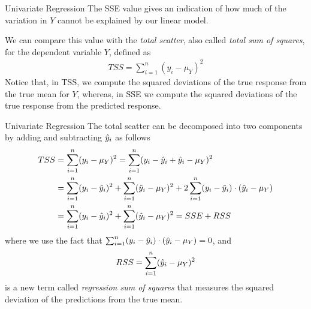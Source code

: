 %
\begin{frame}{Univariate Regression}
The SSE value gives an indication of how much of the variation in $Y$
cannot be explained by our linear model. 

	\medskip

	We can compare this value with
the {\em total scatter}, also called {\em total sum of squares}, 
for the dependent variable $Y$, defined as
\begin{align*}
    TSS = \sum^{n}_{i=1} (y_i - \mu_{Y})^2
\end{align*}
Notice that, in TSS, we compute the squared deviations of the true
response from the true mean for $Y$, whereas, in SSE we compute the
squared deviations of the true response from the predicted response.
%
%
\end{frame}

\begin{frame}{Univariate Regression}
The total scatter can be decomposed into two components by adding and
subtracting $\hat{y}_i$ as follows
\begin{align*}
    TSS & = \sum^{n}_{i=1} (y_i - \mu_{Y})^2
    = \sum^{n}_{i=1} (y_i - \hat{y}_i + \hat{y}_i - \mu_{Y})^2 \\
& = \sum^{n}_{i=1} (y_i - \hat{y}_i)^2 + \sum_{i=1}^n (\hat{y}_i - \mu_{Y})^2 + 
2 \sum^{n}_{i=1} (y_i - \hat{y}_i) \cdot (\hat{y}_i - \mu_Y)\\
& = \sum^{n}_{i=1} (y_i - \hat{y}_i)^2 + \sum_{i=1}^n (\hat{y}_i - \mu_{Y})^2
= SSE + RSS
\end{align*}
where we use the fact that $\sum^{n}_{i=1} (y_i - \hat{y}_i) \cdot (\hat{y}_i -
\mu_Y) = 0$, and
\begin{align*}
RSS = \sum_{i=1}^n (\hat{y}_i - \mu_{Y})^2
\end{align*}
is a new term called
{\em regression sum of squares} that measures the squared deviation of the
predictions from the true mean.
\end{frame}

